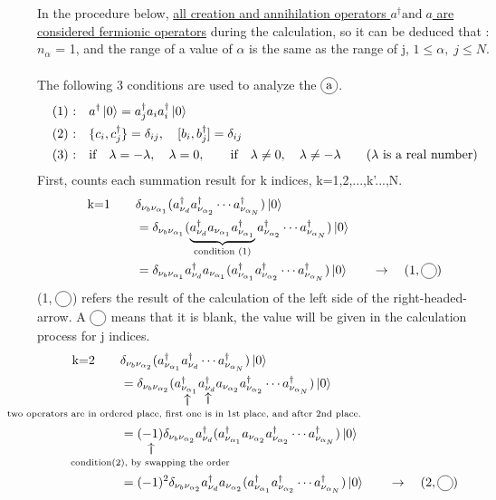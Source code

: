 \documentclass{article}
\makeatletter
\newcommand\vertarrowbox[2]{%
    \begin{array}[t]{@{}c@{}} #1 \\
    \rotatebox{90}{$\xrightarrow{\hphantom{a}}$} \\[-1ex]
    \mathclap{\scriptstyle\text{#2}}%
    \end{array}}
\newcommand\encircle[1]{%
    \tikz[baseline=(X.base)] 
      \node (X) [draw, shape=circle, inner sep=0] {\strut #1};}
\makeatother
\begin{document}
\\ \\ In the procedure below, \underline{all creation and annihilation operators $a^{\dagger} \text{and} \; a$ are considered fermionic operators} during the calculation, so it can be deduced that : $n_{\alpha}$ = 1, and the range of a value of $\alpha$ is the same as the range of j, 
 $1\leq \alpha,\; j \leq N$. \\
 \\
The following 3 conditions are used to analyze the $\encircle{a}$.
\begin{align*}
    & \text{(1) :} \quad a^{\dagger}\ket{0} = a^{\dagger}_j a_i a^{\dagger}_i \ket{0}\\
    & \text{(2) :} \quad \{ c_i , c^{\dagger}_j \} = \delta_{ij}, \quad [b_i , b^{\dagger}_j] = \delta_{ij}\\ 
    & \text{(3) :} \quad \text{if} \quad \lambda=-\lambda, \quad \lambda=0 , \qquad \text{if} \quad \lambda \neq 0, \quad \lambda \neq- \lambda
    \qquad (\text{$\lambda$ is a real number})
\end{align*}
First, counts each summation result for k indices, k=1,2,...,k'...,N.
\begin{align*}
    \text{k=1} \qquad &\delta_{\nu_b \nu_{\alpha_1}} (a^{\dagger}_{\nu_d} a^{\dagger}_{\nu_{\alpha_2}} \cdots a^{\dagger}_{\nu_{\alpha_N}})\ket{0}\\
    & =\delta_{\nu_b \nu_{\alpha_1}} (\underbrace{a^{\dagger}_{\nu_d} a_{\nu_{\alpha_1}} a^{\dagger}_{\nu_{\alpha_1}}}_{\text{condition (1)}}a^{\dagger}_{\nu_{\alpha_2}} \cdots a^{\dagger}_{\nu_{\alpha_N}})\ket{0}\\
    & =\delta_{\nu_b \nu_{\alpha_1}} a^{\dagger}_{\nu_d} a_{\nu_{\alpha_1}} (a^{\dagger}_{\nu_{\alpha_1}}a^{\dagger}_{\nu_{\alpha_2}} \cdots a^{\dagger}_{\nu_{\alpha_N}})\ket{0} \qquad \rightarrow \quad (1,\encircle{})
\end{align*}
(1,$\;\encircle{}$) refers the result of the calculation of the left side of the right-headed-arrow. 
A $\encircle{}$ means that it is blank, the value will be given in the calculation process for j indices.
\begin{align*}
    \text{k=2} \qquad &\delta_{\nu_b \nu_{\alpha_2}} (a^{\dagger}_{\nu_{\alpha_1}} a^{\dagger}_{\nu_d} \cdots a^{\dagger}_{\nu_{\alpha_N}})\ket{0}\\
    & =\delta_{\nu_b \nu_{\alpha_2}} (\vertarrowbox{a^{\dagger}_{\nu_{\alpha_1}}}{\text{two operators are in ordered place, first one is in 1st place, and after 2nd place. }} \vertarrowbox{a^{\dagger}_{\nu_d}}{} a_{\nu_{\alpha_2}} a^{\dagger}_{\nu_{\alpha_2}} \cdots a^{\dagger}_{\nu_{\alpha_N}})\ket{0}\\
    & =\vertarrowbox{(-1)}{\text{condition(2), by swapping the order}} \delta_{\nu_b \nu_{\alpha_2}} a^{\dagger}_{\nu_d} (a^{\dagger}_{\nu_{\alpha_1}} a_{\nu_{\alpha_2}} a^{\dagger}_{\nu_{\alpha_2}} \cdots a^{\dagger}_{\nu_{\alpha_N}})\ket{0}\\
    & =(-1)^2 \delta_{\nu_b \nu_{\alpha_2}} a^{\dagger}_{\nu_d} a_{\nu_{\alpha_2}} (a^{\dagger}_{\nu_{\alpha_1}}  a^{\dagger}_{\nu_{\alpha_2}} \cdots a^{\dagger}_{\nu_{\alpha_N}})\ket{0} \qquad \rightarrow \quad (2,\encircle{})
\end{align*}
\end{document}
